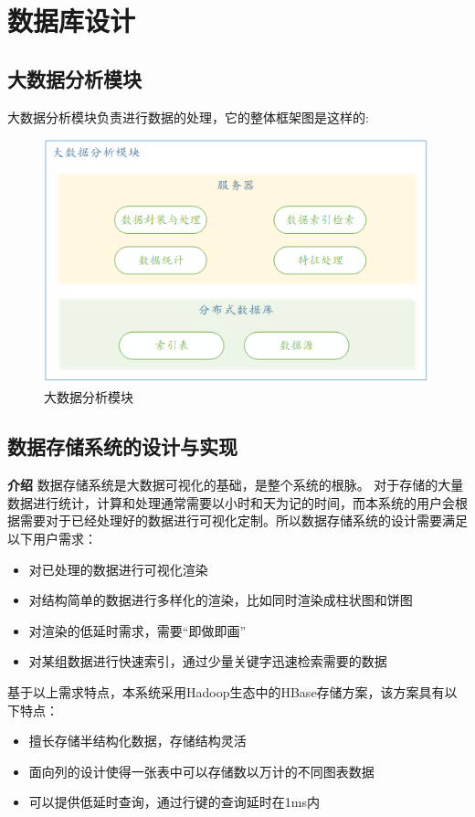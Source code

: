 \newpage
\section{数据库设计}

\subsection{大数据分析模块}
大数据分析模块负责进行数据的处理，它的整体框架图是这样的:
\begin{figure}[!htbp]
	\centering
	\includegraphics[scale=1.2]{image/d1.png}
	\caption{大数据分析模块}
\end{figure}

\subsection{数据存储系统的设计与实现}
\textbf{介绍}
数据存储系统是大数据可视化的基础，是整个系统的根脉。
对于存储的大量数据进行统计，计算和处理通常需要以小时和天为记的时间，而本系统的用户会根据需要对于已经处理好的数据进行可视化定制。所以数据存储系统的设计需要满足以下用户需求：
\begin{itemize}
	\item 对已处理的数据进行可视化渲染
	\item 对结构简单的数据进行多样化的渲染，比如同时渲染成柱状图和饼图
	\item 对渲染的低延时需求，需要“即做即画”
	\item 对某组数据进行快速索引，通过少量关键字迅速检索需要的数据
\end{itemize}

基于以上需求特点，本系统采用Hadoop生态中的HBase存储方案，该方案具有以下特点：
\begin{itemize}
	\item 擅长存储半结构化数据，存储结构灵活
	\item 面向列的设计使得一张表中可以存储数以万计的不同图表数据
	\item 可以提供低延时查询，通过行键的查询延时在1ms内
\end{itemize}
	
